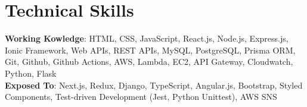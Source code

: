 \documentclass[letterpaper,11pt]{article}
\makeatletter
\newcommand{\resumeSubheading}[4]{
  \vspace{-2pt}\item
    \begin{tabular*}{0.97\textwidth}[t]{l@{\extracolsep{\fill}}r}
      \textbf{#1} & #2 \\
      \textit{\small#3} & \textit{\small #4} \\
    \end{tabular*}\vspace{-7pt}
}
\newcommand{\resumeSubHeadingListStart}{\begin{itemize}[leftmargin=0.15in, label={}]}
\newcommand{\resumeSubHeadingListEnd}{\end{itemize}}
\makeatother
\begin{document}
\section{Technical Skills}
 \begin{itemize}[leftmargin=0.15in, label={}]
    \small{\item{
     \textbf{Working Kowledge}{: HTML, CSS, JavaScript, React.js, Node.js, Express.js, Ionic Framework, Web APIs, REST APIs, MySQL, PostgreSQL, Prisma ORM, Git, Github, Github Actions, AWS, Lambda, EC2, API Gateway, Cloudwatch, Python, Flask} \\
     \vspace{4pt} 
     \textbf{Exposed To}{: Next.js, Redux, Django, TypeScript, Angular.js, Bootstrap, Styled Components, Test-driven Development (Jest, Python Unittest), AWS SNS} \\ 
    }}
 \end{itemize} 




\end{document}
